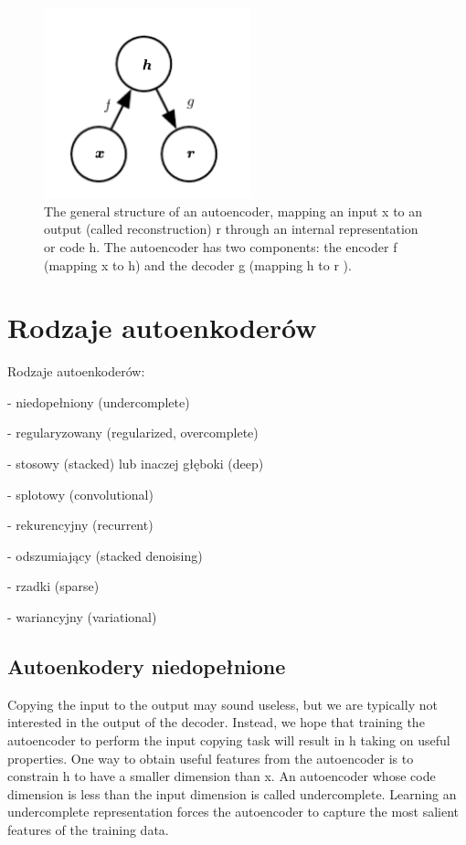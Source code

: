\documentclass[12pt]{mwbk}
\theoremstyle{plain}
\theoremstyle{definition}
\theoremstyle{remark}
\newcommand\zrodlo[1]{\par\vspace{-3mm}{\small\textit{Źródło: }#1 }}
\begin{document}
\begin{figure}[!h]
	\centering
	\includegraphics[width=6cm]{rys/autoencoder_structure.png}
	\caption{The general structure of an autoencoder, mapping an input x to an output
		(called reconstruction) r through an internal representation or code h. The autoencoder
		has two components: the encoder f (mapping x to h) and the decoder g (mapping h
		to r ).}
	\zrodlo{\cite{goodfellow}}
	\label{fig:autoencoder_structue}
\end{figure}

\section{Rodzaje autoenkoderów}

Rodzaje autoenkoderów:

- niedopełniony (undercomplete)

 - regularyzowany (regularized, overcomplete)

- stosowy (stacked) lub inaczej głęboki (deep)

- splotowy (convolutional)

- rekurencyjny (recurrent)

- odszumiający (stacked denoising)

- rzadki (sparse)

- wariancyjny (variational)



\subsection{Autoenkodery niedopełnione}

\cite{goodfellow}

Copying the input to the output may sound useless, but we are typically not
interested in the output of the decoder. Instead, we hope that training the
autoencoder to perform the input copying task will result in h taking on useful
properties.
One way to obtain useful features from the autoencoder is to constrain h to
have a smaller dimension than x. An autoencoder whose code dimension is less
than the input dimension is called undercomplete. Learning an undercomplete
representation forces the autoencoder to capture the most salient features of the
training data.
\end{document}

